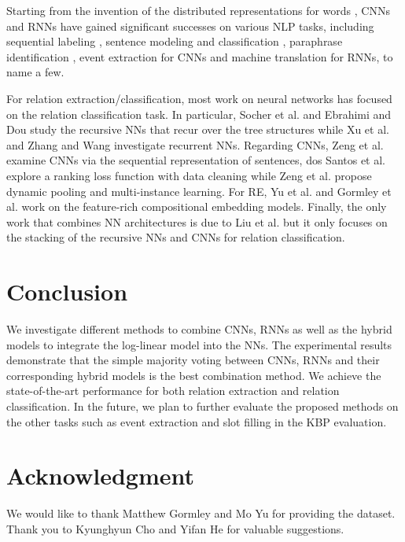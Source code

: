 \documentclass[11pt,letterpaper]{article}
\begin{document}
Starting from the invention of the distributed representations for words \cite{Bengio:03,Mnih:08,Collobert:08,Turian:10,Mikolov:13}, CNNs and RNNs have gained significant successes on various NLP tasks, including sequential labeling \cite{Collobert:11}, sentence modeling and classification \cite{Kalchbrenner:14,Kim:14}, paraphrase identification \cite{Yin:15}, event extraction \cite{Nguyen:15b,Chen:15} for CNNs and machine translation \cite{Cho:14,Bahdanau:15} for RNNs, to name a few.



For relation extraction/classification, most work on neural networks has focused on the relation classification task. In particular, Socher et al.  and Ebrahimi and Dou  study the recursive NNs that recur over the tree structures while Xu et al.  and Zhang and Wang  investigate recurrent NNs. Regarding CNNs, Zeng et al.  examine CNNs via the sequential representation of sentences, dos Santos et al.  explore a ranking loss function with data cleaning while Zeng et al.  propose dynamic pooling and multi-instance learning. For RE, Yu et al.  and Gormley et al.  work on the feature-rich compositional embedding models. Finally, the only work that combines NN architectures is due to Liu et al.  but it only focuses on the stacking of the recursive NNs and CNNs for relation classification.

\section{Conclusion}

We investigate different methods to combine CNNs, RNNs as well as the hybrid models to integrate the log-linear model into the NNs. The experimental results demonstrate that the simple majority voting between CNNs, RNNs and their corresponding hybrid models is the best combination method. We achieve the state-of-the-art performance for both relation extraction and relation classification. In the future, we plan to further evaluate the proposed methods on the other tasks such as event extraction and slot filling in the KBP evaluation.



\section*{Acknowledgment}

We would like to thank Matthew Gormley and Mo Yu for providing the dataset. Thank you to Kyunghyun Cho and Yifan He for valuable suggestions.



\end{document}
